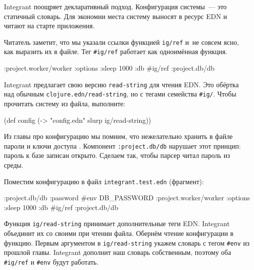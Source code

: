 
Integrant поощряет декларативный подход. Конфигурация системы~--- это статичный
словарь. Для экономии места систему выносят в ресурс EDN и читают на старте
приложения.


Читатель заметит, что мы указали ссылки функцией \verb|ig/ref| и~не совсем
ясно, как выразить их в файле. Тег \verb|#ig/ref| работает как одноимённая
функция.

\begin{english}
  \begin{clojure}
{:project.worker/worker {:options {:sleep 1000}
                         :db #ig/ref :project.db/db}}
  \end{clojure}
\end{english}


Integrant предлагает свою версию \verb|read-string| для чтения EDN. Это обёртка
над обычным \verb|clojure.edn/read-string|, но с тегами семейства
\verb|#ig/|. Чтобы прочитать систему из файла, выполните:

\begin{english}
  \begin{clojure}
(def config
  (-> "config.edn" slurp ig/read-string))
  \end{clojure}
\end{english}


Из главы про конфигурацию мы помним, что нежелательно хранить в файле пароли и
ключи доступа . Компонент \verb|:project.db/db| нарушает
этот принцип: пароль к базе записан открыто. Сделаем так, чтобы парсер читал
пароль из среды.

Поместим конфигурацию в файл \verb|integrant.test.edn| (фрагмент):

\begin{english}
  \begin{clojure}
{:project.db/db {:password #env DB_PASSWORD}
 :project.worker/worker {:options {:sleep 1000}
                         :db #ig/ref :project.db/db}}
  \end{clojure}
\end{english}

Функция \verb|ig/read-string| принимает дополнительные теги EDN. Integrant
объединит их со своими при чтении файла. Обернём чтение конфигурации в
функцию. Первым аргументом в \verb|ig/read-string| укажем словарь с тегом
\verb|#env| из прошлой главы. Integrant дополнит наш словарь собственным,
поэтому оба \verb|#ig/ref| и \verb|#env| будут работать.

